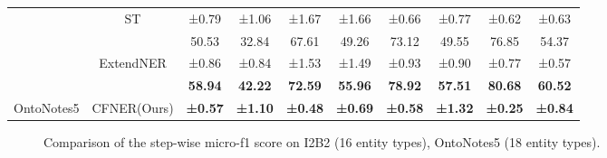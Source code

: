 \documentclass[11pt]{article}
\begin{document}
\begin{table*}[!t]
{\begin{tabular}{@{}cccccccccc@{}}
 & \multirow{-2}{*}{ST} & ±0.79 & ±1.06 & ±1.67 & ±1.66 & ±0.66 & ±0.77 & ±0.62 & ±0.63 \\
 &  & \cellcolor[HTML]{EFEFEF}50.53 & \cellcolor[HTML]{EFEFEF}32.84 & \cellcolor[HTML]{EFEFEF}67.61 & \cellcolor[HTML]{EFEFEF}49.26 & \cellcolor[HTML]{EFEFEF}73.12 & \cellcolor[HTML]{EFEFEF}49.55 & \cellcolor[HTML]{EFEFEF}76.85 & \cellcolor[HTML]{EFEFEF}54.37 \\
 & \multirow{-2}{*}{ExtendNER} & \cellcolor[HTML]{EFEFEF}±0.86 & \cellcolor[HTML]{EFEFEF}±0.84 & \cellcolor[HTML]{EFEFEF}±1.53 & \cellcolor[HTML]{EFEFEF}±1.49 & \cellcolor[HTML]{EFEFEF}±0.93 & \cellcolor[HTML]{EFEFEF}±0.90 & \cellcolor[HTML]{EFEFEF}±0.77 & \cellcolor[HTML]{EFEFEF}±0.57\\
 &  & \textbf{58.94} & \textbf{42.22} & \textbf{72.59} & \textbf{55.96} & \textbf{78.92} & \textbf{57.51} & \textbf{80.68} & \textbf{60.52} \\
\multirow{-12}{*}{OntoNotes5} & \multirow{-2}{*}{CFNER(Ours)} & \textbf{±0.57} & \textbf{±1.10} & \textbf{±0.48} & \textbf{±0.69} & \textbf{±0.58} & \textbf{±1.32} & \textbf{±0.25} & \textbf{±0.84} \\ \bottomrule
\end{tabular}
}
\label{tab:main_result_1_full}
\end{table*}

\begin{figure*}[!t]
    \centering
    \hspace{-0.6cm}\vspace{-0.4cm}
    \hspace{-0.6cm}
    \hspace{-0.6cm}
    \hspace{-0.6cm}
    \hspace{-0.6cm}
    \hspace{-0.6cm}
    \hspace{-0.6cm}
    \caption{Comparison of the step-wise micro-f1 score on I2B2 (16 entity types), OntoNotes5 (18 entity types). }
    \label{fig:main_result_step_1}
\end{figure*}
\end{document}
